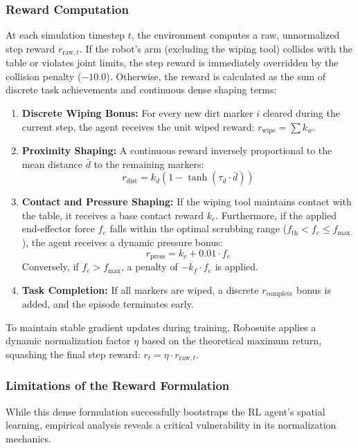 \documentclass[letterpaper, 10 pt, conference]{IEEEtran}
\begin{document}
\subsubsection{Reward Computation}
At each simulation timestep $t$, the environment computes a raw, unnormalized step reward $r_{\text{raw}, t}$. If the robot's arm (excluding the wiping tool) collides with the table or violates joint limits, the step reward is immediately overridden by the collision penalty ($-10.0$). Otherwise, the reward is calculated as the sum of discrete task achievements and continuous dense shaping terms:

\begin{enumerate}
    \item \textbf{Discrete Wiping Bonus:} For every new dirt marker $i$ cleared during the current step, the agent receives the unit wiped reward: $r_{\text{wipe}} = \sum k_w$.
    \item \textbf{Proximity Shaping:} A continuous reward inversely proportional to the mean distance $\bar{d}$ to the remaining markers: 
    \begin{equation}
        r_{\text{dist}} = k_d \left( 1 - \tanh(\tau_d \cdot \bar{d}) \right)
    \end{equation}
    \item \textbf{Contact and Pressure Shaping:} If the wiping tool maintains contact with the table, it receives a base contact reward $k_c$. Furthermore, if the applied end-effector force $f_e$ falls within the optimal scrubbing range ($f_{\text{th}} < f_e \le f_{\text{max}}$), the agent receives a dynamic pressure bonus:
    \begin{equation}
        r_{\text{press}} = k_c + 0.01 \cdot f_e
    \end{equation}
    Conversely, if $f_e > f_{\text{max}}$, a penalty of $-k_f \cdot f_e$ is applied.
    \item \textbf{Task Completion:} If all markers are wiped, a discrete $r_{\text{complete}}$ bonus is added, and the episode terminates early.
\end{enumerate}

To maintain stable gradient updates during training, Robosuite applies a dynamic normalization factor $\eta$ based on the theoretical maximum return, squashing the final step reward: $r_t = \eta \cdot r_{\text{raw}, t}$.

\subsubsection{Limitations of the Reward Formulation}
While this dense formulation successfully bootstraps the RL agent's spatial learning, empirical analysis reveals a critical vulnerability in its normalization mechanics.
\end{document}
